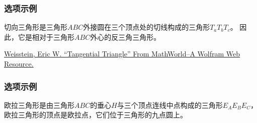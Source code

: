 \documentclass[../main.tex]{subfiles}
\begin{document}
\subsubsection{选项示例}

切向三角形是三角形$ABC$外接圆在三个顶点处的切线构成的三角形$T_aT_bT_c$。
因此，它是相对于三角形$ABC$外心的反三角三角形。\par
\href{https://mathworld.wolfram.com/TangentialTriangle.html}{Weisstein, Eric W.
\enquote{Tangential Triangle} From MathWorld--A Wolfram Web Resource.}

\begin{tkzexample}[latex=8cm,small]
\end{tkzexample}

\newpage

\subsubsection{选项示例}

欧拉三角形是由三角形$ABC$的垂心$H$与三个顶点连线中点构成的三角形$E_AE_BE_C$，
欧拉三角形的顶点是欧拉点，它们位于三角形的九点圆上。
\end{document}
